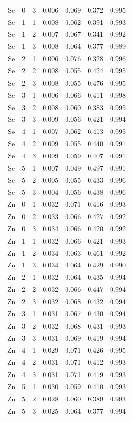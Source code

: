 \documentclass[ms, hidelinks]{uncgdissertationexp}
\theoremstyle{plain}
\theoremstyle{definition}
\theoremstyle{remark}
\begin{document}
\begin{longtable}{ccccccc}
\rowcolor{gray!6}  Se & 0 & 3 & 0.006 & 0.069 & 0.372 & 0.995\\
Se & 1 & 1 & 0.008 & 0.062 & 0.391 & 0.993\\
\rowcolor{gray!6}  Se & 1 & 2 & 0.007 & 0.067 & 0.341 & 0.992\\
Se & 1 & 3 & 0.008 & 0.064 & 0.377 & 0.989\\
\rowcolor{gray!6}  Se & 2 & 1 & 0.006 & 0.076 & 0.328 & 0.996\\
Se & 2 & 2 & 0.008 & 0.055 & 0.424 & 0.995\\
\rowcolor{gray!6}  Se & 2 & 3 & 0.008 & 0.055 & 0.476 & 0.995\\
Se & 3 & 1 & 0.006 & 0.066 & 0.411 & 0.998\\
\rowcolor{gray!6}  Se & 3 & 2 & 0.008 & 0.060 & 0.383 & 0.995\\
Se & 3 & 3 & 0.009 & 0.056 & 0.421 & 0.994\\
\rowcolor{gray!6}  Se & 4 & 1 & 0.007 & 0.062 & 0.413 & 0.995\\
Se & 4 & 2 & 0.009 & 0.055 & 0.440 & 0.991\\
\rowcolor{gray!6}  Se & 4 & 3 & 0.009 & 0.059 & 0.407 & 0.991\\
Se & 5 & 1 & 0.007 & 0.049 & 0.497 & 0.991\\
\rowcolor{gray!6}  Se & 5 & 2 & 0.005 & 0.055 & 0.433 & 0.996\\
Se & 5 & 3 & 0.004 & 0.056 & 0.438 & 0.996\\
\rowcolor{gray!6}  Zn & 0 & 1 & 0.032 & 0.071 & 0.416 & 0.993\\
Zn & 0 & 2 & 0.033 & 0.066 & 0.427 & 0.992\\
\rowcolor{gray!6}  Zn & 0 & 3 & 0.034 & 0.066 & 0.420 & 0.992\\
Zn & 1 & 1 & 0.032 & 0.066 & 0.421 & 0.993\\
\rowcolor{gray!6}  Zn & 1 & 2 & 0.034 & 0.063 & 0.461 & 0.992\\
Zn & 1 & 3 & 0.034 & 0.064 & 0.429 & 0.990\\
\rowcolor{gray!6}  Zn & 2 & 1 & 0.032 & 0.064 & 0.435 & 0.994\\
Zn & 2 & 2 & 0.032 & 0.066 & 0.447 & 0.994\\
\rowcolor{gray!6}  Zn & 2 & 3 & 0.032 & 0.068 & 0.432 & 0.994\\
Zn & 3 & 1 & 0.031 & 0.067 & 0.430 & 0.994\\
\rowcolor{gray!6}  Zn & 3 & 2 & 0.032 & 0.068 & 0.431 & 0.993\\
Zn & 3 & 3 & 0.031 & 0.069 & 0.419 & 0.994\\
\rowcolor{gray!6}  Zn & 4 & 1 & 0.029 & 0.071 & 0.426 & 0.995\\
Zn & 4 & 2 & 0.031 & 0.071 & 0.412 & 0.993\\
\rowcolor{gray!6}  Zn & 4 & 3 & 0.031 & 0.071 & 0.419 & 0.993\\
Zn & 5 & 1 & 0.030 & 0.059 & 0.410 & 0.993\\
\rowcolor{gray!6}  Zn & 5 & 2 & 0.028 & 0.060 & 0.389 & 0.993\\
Zn & 5 & 3 & 0.025 & 0.064 & 0.377 & 0.994\\*
\end{longtable}
\end{document}

